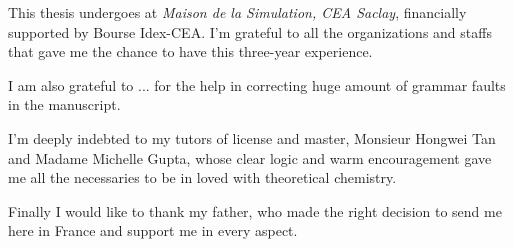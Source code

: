 This thesis undergoes at \textit{Maison de la Simulation, CEA Saclay},
financially supported by Bourse Idex-CEA. I'm grateful to all the
organizations and staffs that gave me the chance to have this three-year
experience.

I am also grateful to ... for the help in correcting huge amount of
grammar faults in the manuscript.

I'm deeply indebted to my tutors of license and master, Monsieur Hongwei
Tan and Madame Michelle Gupta, whose clear logic and warm encouragement
gave me all the necessaries to be in loved with theoretical chemistry.

Finally I would like to thank my father, who made the right decision
to send me here in France and support me in every aspect.

\endgroup
